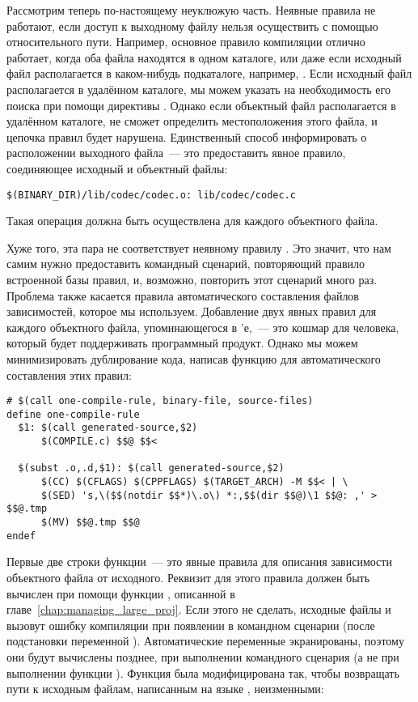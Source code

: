 Рассмотрим теперь по-настоящему неуклюжую часть. Неявные правила не
работают, если доступ к выходному файлу нельзя осуществить с помощью
относительного пути. Например, основное правило компиляции
 отлично работает, когда оба файла находятся в
одном каталоге, или даже если исходный файл располагается в
каком-нибудь подкаталоге, например, .
Если исходный файл располагается в удалённом каталоге, мы можем
указать \GNUmake{} на необходимость его поиска при помощи директивы
. Однако если объектный файл располагается в
удалённом каталоге, \GNUmake{} не сможет определить местоположения
этого файла, и цепочка правил будет нарушена. Единственный способ
информировать \GNUmake{} о расположении выходного файла~--- это
предоставить явное правило, соединяющее исходный и объектный файлы:

{\footnotesize
\begin{verbatim}
$(BINARY_DIR)/lib/codec/codec.o: lib/codec/codec.c
\end{verbatim}
}

Такая операция должна быть осуществлена для каждого объектного файла.

Хуже того, эта пара не соответствует неявному правилу . Это значит, что нам самим нужно предоставить командный
сценарий, повторяющий правило встроенной базы правил, и, возможно,
повторить этот сценарий много раз. Проблема также касается правила
автоматического составления файлов зависимостей, которое мы
используем. Добавление двух явных правил для каждого объектного файла,
упоминающегося в \Makefile{}'е,~--- это кошмар для человека, который
будет поддерживать программный продукт. Однако мы можем минимизировать
дублирование кода, написав функцию для автоматического составления
этих правил:

{\footnotesize
\begin{verbatim}
# $(call one-compile-rule, binary-file, source-files)
define one-compile-rule
  $1: $(call generated-source,$2)
      $(COMPILE.c) $$@ $$<

  $(subst .o,.d,$1): $(call generated-source,$2)
      $(CC) $(CFLAGS) $(CPPFLAGS) $(TARGET_ARCH) -M $$< | \
      $(SED) 's,\($$(notdir $$*)\.o\) *:,$$(dir $$@)\1 $$@: ,' > $$@.tmp
      $(MV) $$@.tmp $$@
endef
\end{verbatim}
}

Первые две строки функции~--- это явные правила для описания
зависимости объектного файла от исходного. Реквизит для этого правила
должен быть вычислен при помощи функции \function{generated-source},
описанной в главе~\ref{chap:managing_large_proj}. Если этого не
сделать, исходные файлы  и  вызовут ошибку
компиляции при появлении в командном сценарии (после подстановки
переменной \variable{\$\^}). Автоматические переменные экранированы,
поэтому они будут вычислены позднее, при выполнении командного
сценария (а не при выполнении функции ). Функция
 была модифицирована так, чтобы возвращать
пути к исходным файлам, написанным на языке \Clang{}, неизменными:

